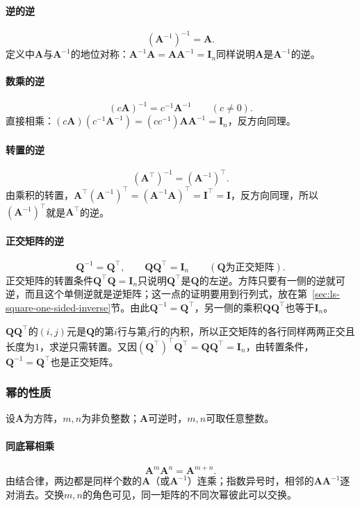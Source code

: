 \paragraph{逆的逆}
\[
 (\bm A^{-1})^{-1}=\bm A.
\]
定义中$\bm A$与$\bm A^{-1}$的地位对称：$\bm A^{-1}\bm A=\bm A\bm A^{-1}=\bm I_n$同样说明$\bm A$是$\bm A^{-1}$的逆。

\paragraph{数乘的逆}
\[
 (c\bm A)^{-1}=c^{-1}\bm A^{-1}\qquad(c\neq0).
\]
直接相乘：$(c\bm A)(c^{-1}\bm A^{-1})=(cc^{-1})\bm A\bm A^{-1}=\bm I_n$，反方向同理。

\paragraph{转置的逆}
\[
 (\bm A^\top)^{-1}=(\bm A^{-1})^\top.
\]
由乘积的转置，$\bm A^\top(\bm A^{-1})^\top=(\bm A^{-1}\bm A)^\top=\bm I^\top=\bm I$，反方向同理，所以$(\bm A^{-1})^\top$就是$\bm A^\top$的逆。

\paragraph{正交矩阵的逆}
\[
 \bm Q^{-1}=\bm Q^\top,\qquad\bm Q\bm Q^\top=\bm I_n\qquad(\bm Q\text{为正交矩阵}).
\]
正交矩阵的转置条件$\bm Q^\top\bm Q=\bm I_n$只说明$\bm Q^\top$是$\bm Q$的左逆。方阵只要有一侧的逆就可逆，而且这个单侧逆就是逆矩阵；这一点的证明要用到行列式，放在第~\ref{sec:ls-square-one-sided-inverse}节。由此$\bm Q^{-1}=\bm Q^\top$，另一侧的乘积$\bm Q\bm Q^\top$也等于$\bm I_n$。

$\bm Q\bm Q^\top$的$(i,j)$元是$\bm Q$的第$i$行与第$j$行的内积，所以正交矩阵的各行同样两两正交且长度为$1$，求逆只需转置。又因$(\bm Q^\top)^\top\bm Q^\top=\bm Q\bm Q^\top=\bm I_n$，由转置条件，$\bm Q^{-1}=\bm Q^\top$也是正交矩阵。

\subsubsection{幂的性质}

设$\bm A$为方阵，$m,n$为非负整数；$\bm A$可逆时，$m,n$可取任意整数。

\paragraph{同底幂相乘}
\[
 \bm A^m\bm A^n=\bm A^{m+n}.
\]
由结合律，两边都是同样个数的$\bm A$（或$\bm A^{-1}$）连乘；指数异号时，相邻的$\bm A\bm A^{-1}$逐对消去。交换$m,n$的角色可见，同一矩阵的不同次幂彼此可以交换。

